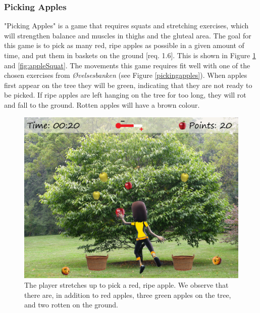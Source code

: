 \subsubsection{Picking Apples}
"Picking Apples" is a game that requires squats and stretching exercises, which will strengthen balance and muscles in thighs and the gluteal area. The goal for this game is to pick as many red, ripe apples as possible in a given amount of time, and put them in baskets on the ground [req. 1.6]. This is shown in Figure \ref{fig:appleStretch} and \ref{fig:appleSquat}. The movements this game requires fit well with one of the chosen exercises from \emph{Øvelsesbanken} (see Figure \ref{pickingapples}). When apples first appear on the tree they will be green, indicating that they are not ready to be picked. If ripe apples are left hanging on the tree for too long, they will rot and fall to the ground. Rotten apples will have a brown colour. 

\begin{figure} [H]
\centering
\includegraphics[scale=0.07]{gameappletreeEng.jpg}
\caption[Picking apples - stretching]{The player stretches up to pick a red, ripe apple. We observe that there are, in addition to red apples, three green apples on the tree, and two rotten on the ground.}
\label{fig:appleStretch}
\end{figure}

